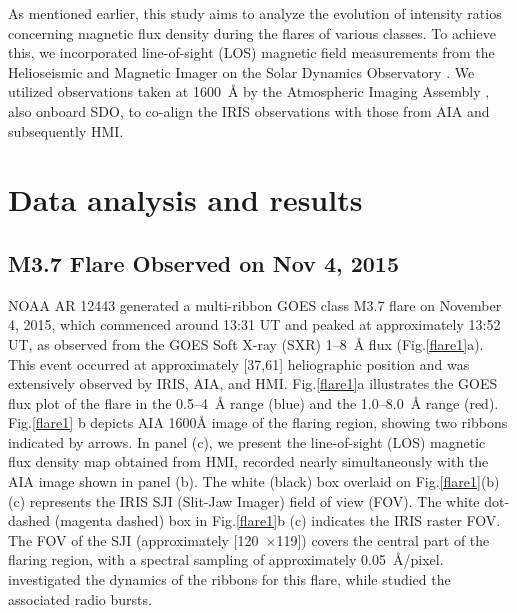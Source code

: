 As mentioned earlier, this study aims to analyze the evolution of intensity ratios concerning magnetic flux density during the flares of various classes. To achieve this, we incorporated line-of-sight (LOS) magnetic field measurements from the Helioseismic and Magnetic Imager \citep[HMI;][]{hmi} on the Solar Dynamics Observatory \citep[SDO;][]{sdo}. We utilized observations taken at 1600~{\AA} by the Atmospheric Imaging Assembly \citep[AIA;][]{aia}, also onboard SDO, to co-align the IRIS observations with those from AIA and subsequently HMI.

\section{Data analysis and results} \label{sec:dar}
\subsection{M3.7 Flare Observed on Nov 4, 2015}

NOAA AR 12443 generated a multi-ribbon GOES class M3.7 flare on November 4, 2015, which commenced around 13:31 UT and peaked at approximately 13:52 UT, as observed from the GOES Soft X-ray (SXR) 1{--}8~{\AA} flux (Fig.\ref{flare1}a). This event occurred at approximately [37\arcsec,61\arcsec] heliographic position and was extensively observed by IRIS, AIA, and HMI. Fig.\ref{flare1}a illustrates the GOES flux plot of the flare in the 0.5{--}4~{\AA} range (blue) and the 1.0{--}8.0~{\AA} range (red). Fig.\ref{flare1} b depicts AIA 1600{\AA} image of the flaring region, showing two ribbons indicated by arrows. In panel (c), we present the line-of-sight (LOS) magnetic flux density map obtained from HMI, recorded nearly simultaneously with the AIA image shown in panel (b). The white (black) box overlaid on Fig.\ref{flare1}(b) (c) represents the IRIS SJI (Slit-Jaw Imager) field of view (FOV). The white dot-dashed (magenta dashed) box in Fig.\ref{flare1}b (c) indicates the IRIS raster FOV. The FOV of the SJI (approximately [120\arcsec~$\times$119\arcsec]) covers the central part of the flaring region, with a spectral sampling of approximately 0.05~{\AA}/pixel. \cite{li17} investigated the dynamics of the ribbons for this flare, while \cite{karlick18} studied the associated radio bursts.

